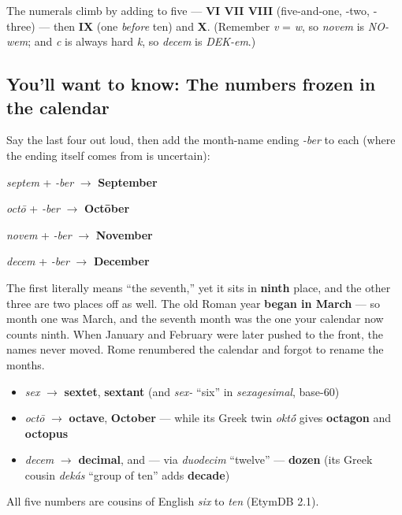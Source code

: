 The numerals climb by adding to five — \textbf{VI VII VIII} (five-and-one, -two, -three) — then \textbf{IX} (one \emph{before} ten) and \textbf{X}. (Remember \emph{v} = \emph{w}, so \emph{novem} is \emph{NO-wem}; and \emph{c} is always hard \emph{k}, so \emph{decem} is \emph{DEK-em}.)

\subsection*{You'll want to know: The numbers frozen in the calendar}
Say the last four out loud, then add the month-name ending \emph{-ber} to each (where the ending itself comes from is uncertain):

\emph{septem} + \emph{-ber} $\to$ \textbf{September}

\emph{octō} + \emph{-ber} $\to$ \textbf{Octōber}

\emph{novem} + \emph{-ber} $\to$ \textbf{November}

\emph{decem} + \emph{-ber} $\to$ \textbf{December}

The first literally means \textquotedblleft{}the seventh,\textquotedblright{} yet it sits in \textbf{ninth} place, and the other three are two places off as well. The old Roman year \textbf{began in March} — so month one was March, and the seventh month was the one your calendar now counts ninth. When January and February were later pushed to the front, the names never moved. Rome renumbered the calendar and forgot to rename the months.

\begin{cousinweb}
\begin{itemize}
\raggedright
  \item \emph{sex} $\to$ \textbf{sextet}, \textbf{sextant} (and \emph{sex-} \textquotedblleft{}six\textquotedblright{} in \emph{sexagesimal}, base-60)
  \item \emph{octō} $\to$ \textbf{octave}, \textbf{October} — while its Greek twin \emph{okt\'{\={o}}} gives \textbf{octagon} and \textbf{octopus}
  \item \emph{decem} $\to$ \textbf{decimal}, and — via \emph{duodecim} \textquotedblleft{}twelve\textquotedblright{} — \textbf{dozen} (its Greek cousin \emph{dekás} \textquotedblleft{}group of ten\textquotedblright{} adds \textbf{decade})
\end{itemize}

All five numbers are cousins of English \emph{six} to \emph{ten} (EtymDB 2.1).
\end{cousinweb}

